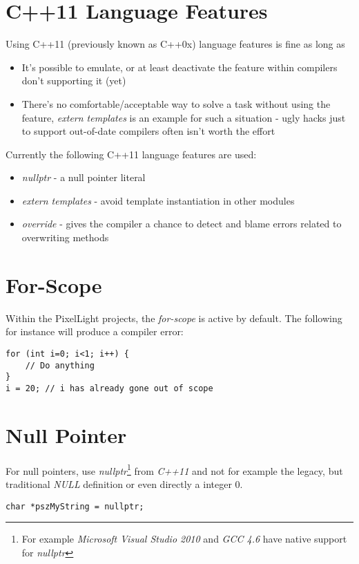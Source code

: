 \section{C++11 Language Features}
Using C++11 (previously known as C++0x) language features is fine as long as
\begin{itemize}
\item{It's possible to emulate, or at least deactivate the feature within compilers don't supporting it (yet)}
\item{There's no comfortable/acceptable way to solve a task without using the feature, \emph{extern templates} is an example for such a situation - ugly hacks just to support out-of-date compilers often isn't worth the effort}
\end{itemize}
\textsl{}
Currently the following C++11 language features are used:
\begin{itemize}
\item{\emph{nullptr} - a null pointer literal}
\item{\emph{extern templates} - avoid template instantiation in other modules}
\item{\emph{override} - gives the compiler a chance to detect and blame errors related to overwriting methods}
\end{itemize}





\section{For-Scope}
Within the PixelLight projects, the \emph{for-scope} is active by default. The following for instance will produce a compiler error:
\begin{lstlisting}[caption=for-scope]
for (int i=0; i<1; i++) {
	// Do anything
}
i = 20;	// i has already gone out of scope
\end{lstlisting}




\section{Null Pointer}
For null pointers, use \emph{nullptr}\footnote{For example \emph{Microsoft Visual Studio 2010} and \emph{\ac{GCC} 4.6} have native support for \emph{nullptr}} from \emph{C++11} and not for example the legacy, but traditional \emph{NULL} definition or even directly a integer $0$.

\begin{lstlisting}[caption=Null pointer]
char *pszMyString = nullptr;
\end{lstlisting}




